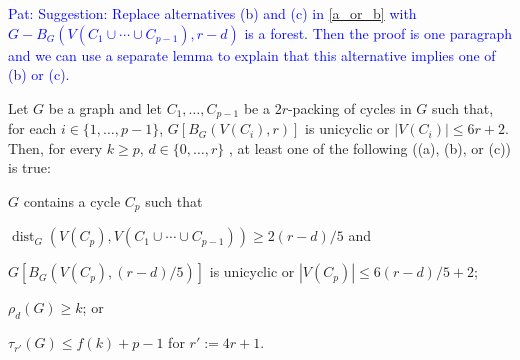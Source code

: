 \documentclass{patmorin}
\newcommand{\pat}[1]{\textcolor{Blue}{Pat: #1}}
\DeclareMathOperator{\dist}{dist}
\begin{document}
\pat{Suggestion: Replace alternatives (b) and (c) in \cref{a_or_b} with  $G-B_G(V(C_1\cup\cdots\cup C_{p-1}),r-d)$ is a forest.  Then the proof is one paragraph and we can use a separate lemma to explain that this alternative implies one of (b) or (c).}


\begin{lem}\label{a_or_b}
  Let $G$ be a graph and let $C_1,\ldots,C_{p-1}$ be a $2r$-packing of cycles in $G$ such that, for each $i\in\{1,\ldots,p-1\}$,  $G[B_G(V(C_i),r)]$ is unicyclic or $|V(C_i)|\le 6r+2$.  Then, for every $k\ge p$, $d\in\{0,\ldots,r\}$
  , at least one of the following ((a), (b), or (c)) is true:
  \begin{compactenum}[(a)]
    \item $G$ contains a cycle $C_p$ such that
    \begin{compactenum}[(i)]
      \item $\dist_G(V(C_p),V(C_1\cup\cdots\cup C_{p-1}))\ge 2(r-d)/5$ and
      \item $G[B_G(V(C_p),(r-d)/5)]$ is unicyclic or $|V(C_p)|\le 6(r-d)/5+2$;
    \end{compactenum}
    \item $\rho_d(G)\ge k$; or
    \item $\tau_{r'}(G) \le f(k)+p-1$ for $r':=4r+1$.
  \end{compactenum}
\end{lem}
\end{document}
